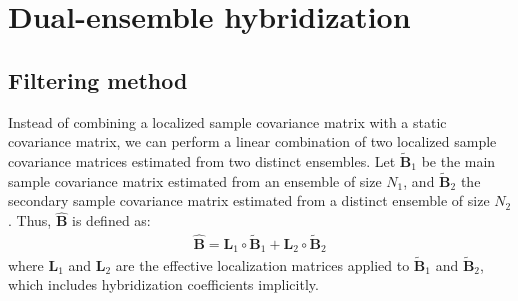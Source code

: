 \documentclass[12pt]{scrartcl}
\begin{document}
\clearpage

\section{Dual-ensemble hybridization}

\subsection{Filtering method}
Instead of combining a localized sample covariance matrix with a static covariance matrix, we can perform a linear combination of two localized sample covariance matrices estimated from two distinct ensembles. Let $\widetilde{\mathbf{B}}_1$ be the main sample covariance matrix estimated from an ensemble of size $N_1$, and $\widetilde{\mathbf{B}}_2$ the secondary sample covariance matrix estimated from a distinct ensemble of size $N_2$. Thus, $\widehat{\mathbf{B}}$ is defined as:
\begin{align}
\widehat{\mathbf{B}} = \mathbf{L}_1 \circ \widetilde{\mathbf{B}}_1 + \mathbf{L}_2 \circ \widetilde{\mathbf{B}}_2
\end{align}
where $\mathbf{L}_1$ and $\mathbf{L}_2$ are the effective localization matrices applied to $\widetilde{\mathbf{B}}_1$ and $\widetilde{\mathbf{B}}_2$, which includes hybridization coefficients implicitly.
\end{document}
